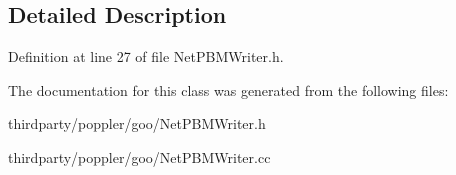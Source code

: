 \subsection{Detailed Description}


Definition at line 27 of file Net\+P\+B\+M\+Writer.\+h.



The documentation for this class was generated from the following files\+:\begin{DoxyCompactItemize}
\item 
thirdparty/poppler/goo/Net\+P\+B\+M\+Writer.\+h\item 
thirdparty/poppler/goo/Net\+P\+B\+M\+Writer.\+cc\end{DoxyCompactItemize}
